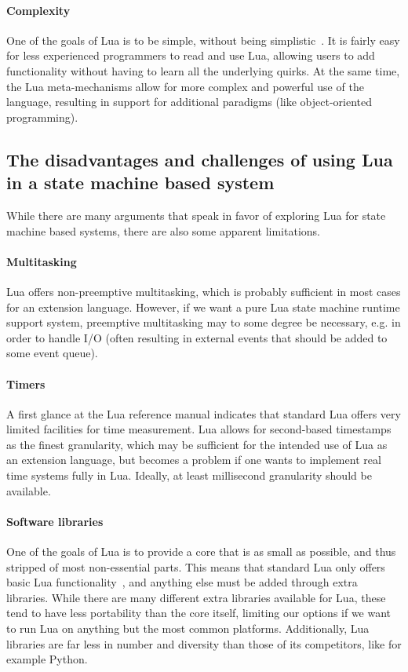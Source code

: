 \paragraph{Complexity}
One of the goals of Lua is to be simple, without being simplistic~\cite{article:the_implementation_of_lua}. It is fairly easy for less experienced programmers to read and use Lua, allowing users to add functionality without having to learn all the underlying quirks. At the same time, the Lua meta-mechanisms allow for more complex and powerful use of the language, resulting in support for additional paradigms (like object-oriented programming).

\subsection{The disadvantages and challenges of using Lua in a state machine based system}
\label{sec:lua_disadvantages}
While there are many arguments that speak in favor of exploring Lua for state machine based systems, there are also some apparent limitations.

\paragraph{Multitasking}
Lua offers non-preemptive multitasking, which is probably sufficient in most cases for an extension language. However, if we want a pure Lua state machine runtime support system, preemptive multitasking may to some degree be necessary, e.g. in order to handle I/O (often resulting in external events that should be added to some event queue).

\paragraph{Timers}
A first glance at the Lua reference manual indicates that standard Lua offers very limited facilities for time measurement. Lua allows for second-based timestamps as the finest granularity, which may be sufficient for the intended use of Lua as an extension language, but becomes a problem if one wants to implement real time systems fully in Lua. Ideally, at least millisecond granularity should be available.

\paragraph{Software libraries}
One of the goals of Lua is to provide a core that is as small as possible, and thus stripped of most non-essential parts. This means that standard Lua only offers basic Lua functionality~\cite[ch. 6]{manual:lua_reference_manual}, and anything else must be added through extra libraries. While there are many different extra libraries available for Lua, these tend to have less portability than the core itself, limiting our options if we want to run Lua on anything but the most common platforms. Additionally, Lua libraries are far less in number and diversity than those of its competitors, like for example Python.

